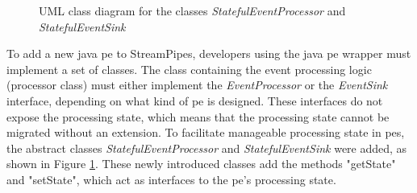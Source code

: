 \begin{figure}[!t]
    \centering
    
    
    \caption{UML class diagram for the classes \textit{StatefulEventProcessor} and \textit{StatefulEventSink}}
    \label{fStatufulEventOperatorUML}
\end{figure}
To add a new java \gls{pe} to StreamPipes, developers using the java \gls{pe} wrapper must implement a set of classes. The class containing the event processing logic (processor class) must either implement the \textit{EventProcessor} or the \textit{EventSink} interface, depending on what kind of \gls{pe} is designed. These interfaces do not expose the processing state, which means that the processing state cannot be migrated without an extension. To facilitate manageable processing state in \gls{pe}s, the abstract classes \textit{StatefulEventProcessor} and \textit{StatefulEventSink} were added, as shown in Figure \ref{fStatufulEventOperatorUML}. These newly introduced classes add the methods "getState" and "setState", which act as interfaces to the \gls{pe}'s processing state.\\

